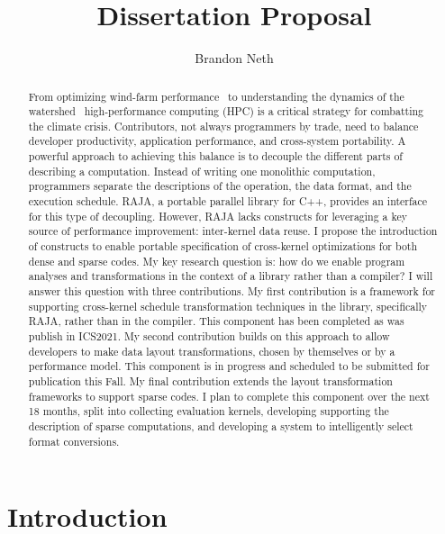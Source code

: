 \documentclass{article}
\author{Brandon Neth}
\title{Dissertation Proposal}
\begin{document}
\maketitle



\begin{abstract}
From optimizing wind-farm performance~\cite{sprague2020exawind} to understanding the dynamics of the watershed~\cite{olschanowsky2019hydroframe,condon2013implementation}
high-performance computing (HPC) is a critical strategy for combatting the climate crisis. 
Contributors, not always programmers by trade, need to balance developer productivity, application performance, and cross-system portability.
A powerful approach to achieving this balance is to decouple the different parts of describing a computation. 
Instead of writing one monolithic computation, programmers separate the descriptions of the operation, the data format, and the execution schedule.
RAJA, a portable parallel library for C++, provides an interface for this type of decoupling.
However, RAJA lacks constructs for leveraging a key source of performance improvement: inter-kernel data reuse.
I propose the introduction of constructs to enable portable specification of cross-kernel optimizations for both dense and sparse codes.
My key research question is: how do we enable program analyses and transformations in the context of a library rather than a compiler?
I will answer this question with three contributions.
My first contribution is a framework for supporting cross-kernel schedule transformation techniques in the library, specifically RAJA, rather than in the compiler. 
This component has been completed as was publish in ICS2021.
My second contribution builds on this approach to allow developers to make data layout transformations, chosen by themselves or by a performance model.
This component is in progress and scheduled to be submitted for publication this Fall.
My final contribution extends the layout transformation frameworks to support sparse codes.
I plan to complete this component over the next 18 months, split into collecting evaluation kernels, developing supporting the description of sparse computations, and developing a system to intelligently select format conversions.
\end{abstract}



\section{Introduction}
\end{document}
